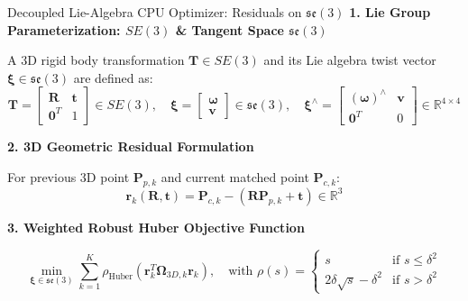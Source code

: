 \documentclass[aspectratio=169, 10pt]{beamer}
\begin{document}
\begin{frame}{Decoupled Lie-Algebra CPU Optimizer: Residuals on $\mathfrak{se}(3)$}
  {\normalsize \textbf{\textcolor{NavyBlue}{1. Lie Group Parameterization: $SE(3)$ \& Tangent Space $\mathfrak{se}(3)$}}}
  \vspace{0.1cm}

  A 3D rigid body transformation $\mathbf{T} \in SE(3)$ and its Lie algebra twist vector $\boldsymbol{\xi} \in \mathfrak{se}(3)$ are defined as:
  \begin{equation}
    \mathbf{T} = \begin{bmatrix} \mathbf{R} & \mathbf{t} \\ \mathbf{0}^T & 1 \end{bmatrix} \in SE(3), \quad \boldsymbol{\xi} = \begin{bmatrix} \boldsymbol{\omega} \\ \mathbf{v} \end{bmatrix} \in \mathfrak{se}(3), \quad \boldsymbol{\xi}^\wedge = \begin{bmatrix} (\boldsymbol{\omega})^\wedge & \mathbf{v} \\ \mathbf{0}^T & 0 \end{bmatrix} \in \mathbb{R}^{4 \times 4}
  \end{equation}

  \vspace{0.2cm}
  {\normalsize \textbf{\textcolor{NavyBlue}{2. 3D Geometric Residual Formulation}}}
  \vspace{0.1cm}

  For previous 3D point $\mathbf{P}_{p,k}$ and current matched point $\mathbf{P}_{c,k}$:
  \begin{equation}
    \mathbf{r}_k(\mathbf{R}, \mathbf{t}) = \mathbf{P}_{c,k} - (\mathbf{R} \mathbf{P}_{p,k} + \mathbf{t}) \in \mathbb{R}^3
  \end{equation}

  \vspace{0.2cm}
  {\normalsize \textbf{\textcolor{NavyBlue}{3. Weighted Robust Huber Objective Function}}}
  \vspace{0.1cm}

  \begin{equation}
    \min_{\boldsymbol{\xi} \in \mathfrak{se}(3)} \sum_{k=1}^K \rho_{\text{Huber}} \left( \mathbf{r}_k^T \mathbf{\Omega}_{3D, k} \mathbf{r}_k \right), \quad \text{with } \rho(s) = \begin{cases} s & \text{if } s \le \delta^2 \\ 2\delta \sqrt{s} - \delta^2 & \text{if } s > \delta^2 \end{cases}
  \end{equation}
\end{frame}
\end{document}
